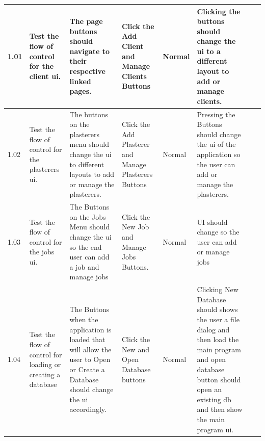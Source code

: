 \begin{landscape}
\begin{center}
\begin{longtable}{|p{1.5cm}|p{2.5cm}|p{2.5cm}|p{2cm}|p{2cm}|p{2cm}|p{2cm}|p{2cm}|}
        1.01 & Test the flow of control for the client ui. & The page buttons should navigate to their respective linked pages. & Click the Add Client and Manage Clients Buttons & Normal & Clicking the buttons should change the ui to a different layout to add or manage clients. & & \\ \hline
		1.02 & Test the flow of control for the plasterers ui. & The buttons on the plasterers menu should change the ui to different layouts to add or manage the plasterers. & Click the Add Plasterer and Manage Plasterers Buttons & Normal & Pressing the Buttons should change the ui of the application so the user can add or manage the plasterers. & & \\ \hline
		1.03 & Test the flow of control for the jobs ui. & The Buttons on the Jobs Menu should change the ui so the end user can add a job and manage jobs & Click the New Job and Manage Jobs Buttons. & Normal & UI should change so the user can add or manage jobs & & \\ \hline

		1.04 & Test the flow of control for loading or creating a database & The Buttons when the application is loaded that will allow the user to Open or Create a Database should change the ui accordingly. & Click the New and Open Database buttons & Normal & Clicking New Database should shows the user a file dialog and then load the main program and open database button should open an existing db and then show the main program ui. & & \\ \hline \hline




\end{longtable}
\end{center}
\end{landscape}
